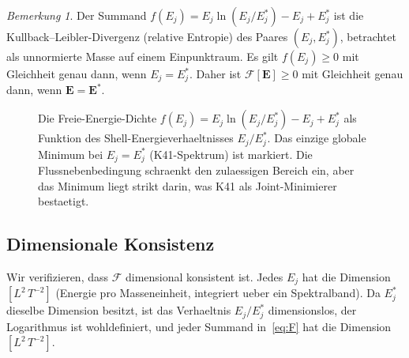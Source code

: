\documentclass[12pt,a4paper]{article}
\theoremstyle{definition}
\theoremstyle{plain}
\theoremstyle{remark}
\newtheorem{remark}[definition]{Bemerkung}
\begin{document}
\begin{remark}
Der Summand $f(E_j) = E_j \ln(E_j/E_j^*) - E_j + E_j^*$ ist die
Kullback--Leibler-Divergenz (relative Entropie) des Paares $(E_j, E_j^*)$,
betrachtet als unnormierte Masse auf einem Einpunktraum. Es gilt
$f(E_j) \ge 0$ mit Gleichheit genau dann, wenn $E_j = E_j^*$. Daher ist
$\mathcal{F}[\mathbf{E}] \ge 0$ mit Gleichheit genau dann, wenn
$\mathbf{E} = \mathbf{E}^*$.
\end{remark}

\begin{figure}[ht]
\centering
{}
\caption{Die Freie-Energie-Dichte $f(E_j) = E_j \ln(E_j / E_j^*) - E_j + E_j^*$
als Funktion des Shell-Energieverhaeltnisses $E_j / E_j^*$. Das einzige globale
Minimum bei $E_j = E_j^*$ (K41-Spektrum) ist markiert. Die Flussnebenbedingung
schraenkt den zulaessigen Bereich ein, aber das Minimum liegt strikt darin, was
K41 als Joint-Minimierer bestaetigt.}
\label{fig:FE-landscape}
\end{figure}

\subsection{Dimensionale Konsistenz}

Wir verifizieren, dass $\mathcal{F}$ dimensional konsistent ist. Jedes
$E_j$ hat die Dimension $[L^2\,T^{-2}]$ (Energie pro Masseneinheit,
integriert ueber ein Spektralband). Da $E_j^*$ dieselbe Dimension besitzt,
ist das Verhaeltnis $E_j/E_j^*$ dimensionslos, der Logarithmus ist
wohldefiniert, und jeder Summand in~\eqref{eq:F} hat die Dimension
$[L^2\,T^{-2}]$.

\end{document}
